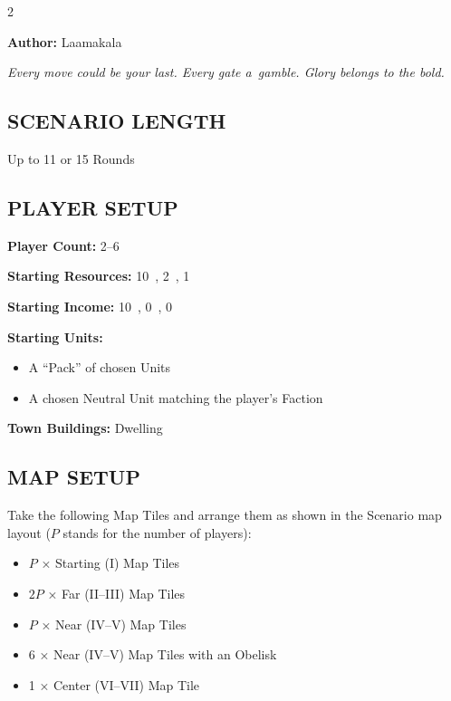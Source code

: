 
\begin{multicols*}{2}

\textbf{Author:} Laamakala

\textit{Every move could be your last. Every gate a~gamble. Glory belongs to the bold.}

\subsection*{\MakeUppercase{Scenario Length}}
Up to 11 or 15 Rounds

\subsection*{\MakeUppercase{Player Setup}}
\textbf{Player Count:} 2--6

\textbf{Starting Resources:} 10~, 2~, 1~

\textbf{Starting Income:} 10~, 0~, 0~

\textbf{Starting Units:}

\begin{itemize}
  \item A ``Pack'' of chosen  Units
  \item A chosen Neutral  Unit matching the player's Faction
\end{itemize}

\textbf{Town Buildings:}  Dwelling

\subsection*{\MakeUppercase{Map Setup}}

Take the following Map Tiles and arrange them as shown in the Scenario map layout ($P$ stands for the number of players):

\begin{itemize}
  \item $P$ × Starting (I) Map Tiles
  \item $2P$ × Far (II--III) Map Tiles
  \item $P$ × Near (IV--V) Map Tiles
  \item 6 × Near (IV--V) Map Tiles with an Obelisk
  \item 1 × Center (VI--VII) Map Tile
\end{itemize}


\end{multicols*}
